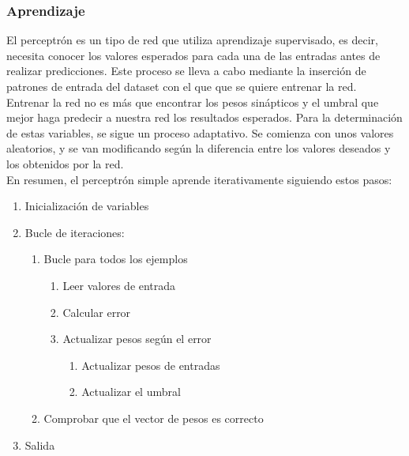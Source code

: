 \subsubsection{Aprendizaje}
El perceptrón es un tipo de red que utiliza aprendizaje supervisado, es decir, necesita conocer los valores esperados para cada una de las entradas antes de realizar predicciones. Este proceso se lleva a cabo mediante la inserción de patrones de entrada del dataset con el que que se quiere entrenar la red.\\
Entrenar la red no es más que encontrar los pesos sinápticos y el umbral que mejor haga predecir a nuestra red los resultados esperados. Para la determinación de estas variables, se sigue un proceso adaptativo. Se comienza con unos valores aleatorios, y se van modificando según la diferencia entre los valores deseados y los obtenidos por la red.\\
En resumen, el perceptrón simple aprende iterativamente siguiendo estos pasos:
\begin{enumerate}
\item Inicialización de variables
\item Bucle de iteraciones:
\begin{enumerate}
\item Bucle para todos los ejemplos
\begin{enumerate}
\item Leer valores de entrada
\item Calcular error
\item Actualizar pesos según el error
\begin{enumerate}
\item Actualizar pesos de entradas
\item Actualizar el umbral
\end{enumerate}
\end{enumerate}
\item Comprobar que el vector de pesos es correcto
\end{enumerate}
\item Salida
\end{enumerate}

